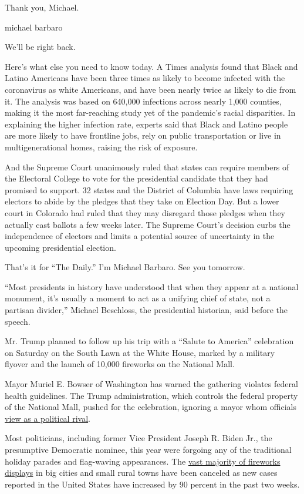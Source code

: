 Thank you, Michael.

michael barbaro

We'll be right back.

Here's what else you need to know today. A Times analysis found that
Black and Latino Americans have been three times as likely to become
infected with the coronavirus as white Americans, and have been nearly
twice as likely to die from it. The analysis was based on 640,000
infections across nearly 1,000 counties, making it the most far-reaching
study yet of the pandemic's racial disparities. In explaining the higher
infection rate, experts said that Black and Latino people are more
likely to have frontline jobs, rely on public transportation or live in
multigenerational homes, raising the risk of exposure.

And the Supreme Court unanimously ruled that states can require members
of the Electoral College to vote for the presidential candidate that
they had promised to support. 32 states and the District of Columbia
have laws requiring electors to abide by the pledges that they take on
Election Day. But a lower court in Colorado had ruled that they may
disregard those pledges when they actually cast ballots a few weeks
later. The Supreme Court's decision curbs the independence of electors
and limits a potential source of uncertainty in the upcoming
presidential election.

That's it for ``The Daily.'' I'm Michael Barbaro. See you tomorrow.

``Most presidents in history have understood that when they appear at a
national monument, it's usually a moment to act as a unifying chief of
state, not a partisan divider,'' Michael Beschloss, the presidential
historian, said before the speech.

Mr. Trump planned to follow up his trip with a ``Salute to America''
celebration on Saturday on the South Lawn at the White House, marked by
a military flyover and the launch of 10,000 fireworks on the National
Mall.

Mayor Muriel E. Bowser of Washington has warned the gathering violates
federal health guidelines. The Trump administration, which controls the
federal property of the National Mall, pushed for the celebration,
ignoring a mayor whom officials
\href{https://www.nytimes.com/2020/06/05/us/politics/muriel-bowser-trump.html}{view
as a political rival}.

Most politicians, including former Vice President Joseph R. Biden Jr.,
the presumptive Democratic nominee, this year were forgoing any of the
traditional holiday parades and flag-waving appearances. The
\href{https://www.nytimes.com/2020/07/01/business/fourth-of-july-fireworks-displays.html}{vast
majority of fireworks displays} in big cities and small rural towns have
been canceled as new cases reported in the United States have increased
by 90 percent in the past two weeks.

